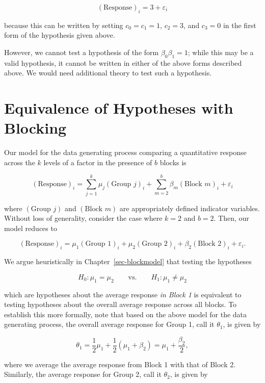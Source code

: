 \documentclass[
  letterpaper,
  DIV=11,
  numbers=noendperiod]{scrreprt}
\theoremstyle{definition}
\theoremstyle{definition}
\theoremstyle{plain}
\theoremstyle{remark}
\begin{document}
\[(\text{Response})_i = 3 + \varepsilon_i\]

because this can be written by setting \(c_0 = c_1 = 1\), \(c_2 = 3\),
and \(c_3 = 0\) in the first form of the hypothesis given above.

However, we cannot test a hypothesis of the form \(\beta_0\beta_1 = 1\);
while this may be a valid hypothesis, it cannot be written in either of
the above forms described above. We would need additional theory to test
such a hypothesis.

\hypertarget{equivalence-of-hypotheses-with-blocking}{%
\section{Equivalence of Hypotheses with
Blocking}\label{equivalence-of-hypotheses-with-blocking}}

Our model for the data generating process comparing a quantitative
response across the \(k\) levels of a factor in the presence of \(b\)
blocks is

\[(\text{Response})_i = \sum_{j=1}^{k} \mu_j (\text{Group } j)_i + \sum_{m=2}^{b} \beta_m (\text{Block } m)_i + \varepsilon_i\]

where \((\text{Group } j)\) and \((\text{Block } m)\) are appropriately
defined indicator variables. Without loss of generality, consider the
case where \(k = 2\) and \(b = 2\). Then, our model reduces to

\[(\text{Response})_i = \mu_1 (\text{Group 1})_i + \mu_2 (\text{Group 2})_i + \beta_2 (\text{Block 2})_i + \varepsilon_i.\]

We argue heuristically in Chapter~\ref{sec-blockmodel} that testing the
hypotheses

\[H_0: \mu_1 = \mu_2 \qquad \text{vs.} \qquad H_1: \mu_1 \neq \mu_2\]

which are hypotheses about the average response \emph{in Block 1} is
equivalent to testing hypotheses about the overall average response
across all blocks. To establish this more formally, note that based on
the above model for the data generating process, the overall average
response for Group 1, call it \(\theta_1\), is given by

\[\theta_1 = \frac{1}{2} \mu_1 + \frac{1}{2} \left(\mu_1 + \beta_2\right) = \mu_1 + \frac{\beta_2}{2},\]

where we average the average response from Block 1 with that of Block 2.
Similarly, the average response for Group 2, call it \(\theta_2\), is
given by
\end{document}

